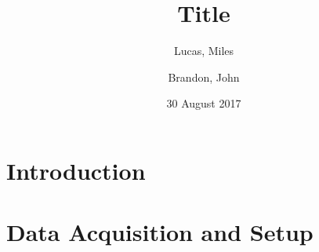 \documentclass[%
aip,
jmp,
reprint,
]{revtex4-1}
\begin{document}
	
	\title[Short title]{Title}
	
	\author{Lucas, Miles}
	\author{Brandon, John}
	
	\date{30 August 2017}
	
	

	\begin{abstract}
	
		
	\end{abstract}
	
	\maketitle
	

	\section{Introduction}
	
	


	\section{Data Acquisition and Setup}
	
	
\end{document}
